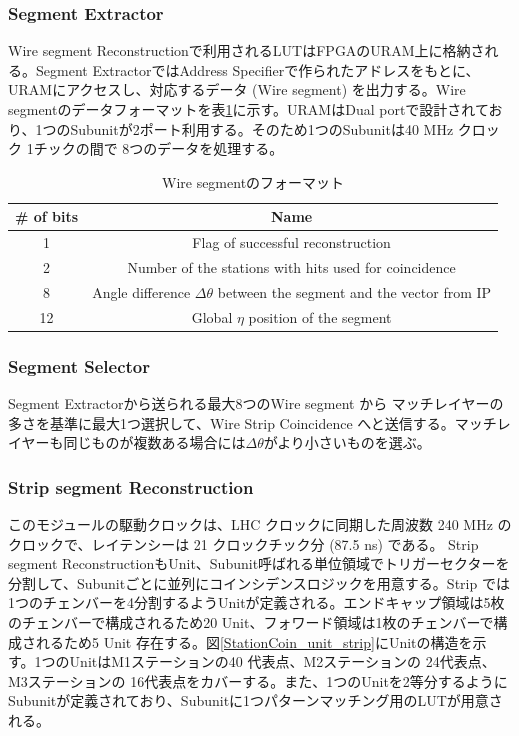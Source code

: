 \subsubsection*{Segment Extractor}
Wire segment Reconstructionで利用されるLUTはFPGAのURAM上に格納される。Segment ExtractorではAddress Specifierで作られたアドレスをもとに、URAMにアクセスし、対応するデータ (Wire segment) を出力する。Wire segmentのデータフォーマットを表\ref{tab:WireSegment}に示す。URAMはDual portで設計されており、1つのSubunitが2ポート利用する。そのため1つのSubunitは40 MHz クロック 1チックの間で 8つのデータを処理する。

\begin{table}[h]
    \centering
    \caption{Wire segmentのフォーマット}
    \label{tab:WireSegment}
    \begin{tabular}{|c|c|}
    \hline
    \# of bits & Name                                                                       \\ \hline\hline
    1          & Flag of successful reconstruction                                          \\ \hline
    2          & Number of the stations with hits used for coincidence                      \\ \hline
    8          & Angle difference $\Delta\theta$ between the segment and the vector from IP \\ \hline
    12         & Global $\eta$ position of the segment                                      \\ \hline
    \end{tabular}
\end{table}

\subsubsection*{Segment Selector}
Segment Extractorから送られる最大8つのWire segment から マッチレイヤーの多さを基準に最大1つ選択して、Wire Strip Coincidence へと送信する。マッチレイヤーも同じものが複数ある場合には$\Delta\theta$がより小さいものを選ぶ。

\subsubsection{Strip segment Reconstruction}
このモジュールの駆動クロックは、LHC クロックに同期した周波数 240 MHz のクロックで、レイテンシーは 21 クロックチック分 (87.5 ns) である。
Strip segment ReconstructionもUnit、Subunit呼ばれる単位領域でトリガーセクターを分割して、Subunitごとに並列にコインシデンスロジックを用意する。Strip では 1つのチェンバーを4分割するようUnitが定義される。エンドキャップ領域は5枚のチェンバーで構成されるため20 Unit、フォワード領域は1枚のチェンバーで構成されるため5 Unit 存在する。図\ref{StationCoin_unit_strip}にUnitの構造を示す。1つのUnitはM1ステーションの40 代表点、M2ステーションの 24代表点、M3ステーションの 16代表点をカバーする。また、1つのUnitを2等分するようにSubunitが定義されており、Subunitに1つパターンマッチング用のLUTが用意される。

